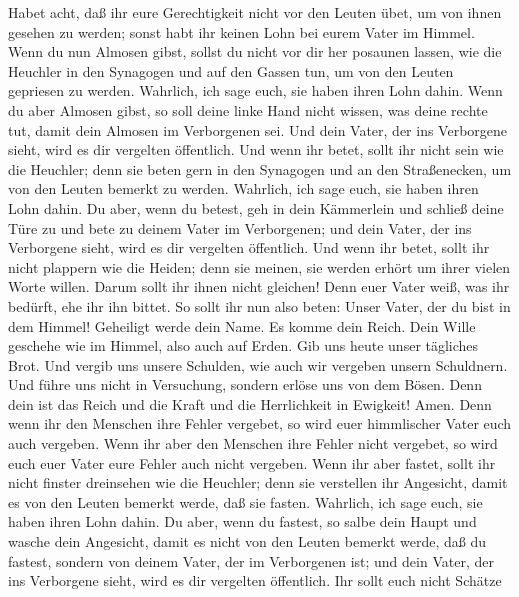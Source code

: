  Habet acht, daß ihr eure Gerechtigkeit nicht vor den
Leuten übet, um von ihnen gesehen zu werden; sonst habt ihr keinen Lohn
bei eurem Vater im Himmel.  Wenn du nun Almosen gibst,
sollst du nicht vor dir her posaunen lassen, wie die Heuchler in den
Synagogen und auf den Gassen tun, um von den Leuten gepriesen zu werden.
Wahrlich, ich sage euch, sie haben ihren Lohn dahin.  Wenn
du aber Almosen gibst, so soll deine linke Hand nicht wissen, was deine
rechte tut,  damit dein Almosen im Verborgenen sei. Und
dein Vater, der ins Verborgene sieht, wird es dir vergelten öffentlich.
 Und wenn ihr betet, sollt ihr nicht sein wie die
Heuchler; denn sie beten gern in den Synagogen und an den Straßenecken,
um von den Leuten bemerkt zu werden. Wahrlich, ich sage euch, sie haben
ihren Lohn dahin.  Du aber, wenn du betest, geh in dein
Kämmerlein und schließ deine Türe zu und bete zu deinem Vater im
Verborgenen; und dein Vater, der ins Verborgene sieht, wird es dir
vergelten öffentlich.  Und wenn ihr betet, sollt ihr nicht
plappern wie die Heiden; denn sie meinen, sie werden erhört um ihrer
vielen Worte willen.  Darum sollt ihr ihnen nicht
gleichen! Denn euer Vater weiß, was ihr bedürft, ehe ihr ihn bittet.
 So sollt ihr nun also beten: Unser Vater, der du bist in
dem Himmel! Geheiligt werde dein Name.  Es komme dein
Reich. Dein Wille geschehe wie im Himmel, also auch auf Erden.
 Gib uns heute unser tägliches Brot.  Und
vergib uns unsere Schulden, wie auch wir vergeben unsern Schuldnern.
 Und führe uns nicht in Versuchung, sondern erlöse uns
von dem Bösen. Denn dein ist das Reich und die Kraft und die
Herrlichkeit in Ewigkeit! Amen.  Denn wenn ihr den
Menschen ihre Fehler vergebet, so wird euer himmlischer Vater euch auch
vergeben.  Wenn ihr aber den Menschen ihre Fehler nicht
vergebet, so wird euch euer Vater eure Fehler auch nicht vergeben.
 Wenn ihr aber fastet, sollt ihr nicht finster dreinsehen
wie die Heuchler; denn sie verstellen ihr Angesicht, damit es von den
Leuten bemerkt werde, daß sie fasten. Wahrlich, ich sage euch, sie haben
ihren Lohn dahin.  Du aber, wenn du fastest, so salbe
dein Haupt und wasche dein Angesicht,  damit es nicht von
den Leuten bemerkt werde, daß du fastest, sondern von deinem Vater, der
im Verborgenen ist; und dein Vater, der ins Verborgene sieht, wird es
dir vergelten öffentlich.  Ihr sollt euch nicht Schätze
